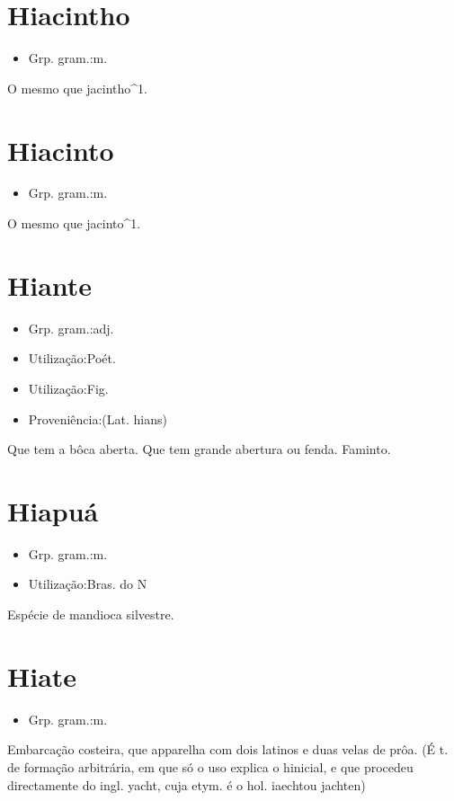 \documentclass{article}
\begin{document}
\section{Hiacintho}
\begin{itemize}
\item {Grp. gram.:m.}
\end{itemize}
O mesmo que \textunderscore jacintho\textunderscore ^1.
\section{Hiacinto}
\begin{itemize}
\item {Grp. gram.:m.}
\end{itemize}
O mesmo que \textunderscore jacinto\textunderscore ^1.
\section{Hiante}
\begin{itemize}
\item {Grp. gram.:adj.}
\end{itemize}
\begin{itemize}
\item {Utilização:Poét.}
\end{itemize}
\begin{itemize}
\item {Utilização:Fig.}
\end{itemize}
\begin{itemize}
\item {Proveniência:(Lat. \textunderscore hians\textunderscore )}
\end{itemize}
Que tem a bôca aberta.
Que tem grande abertura ou fenda.
Faminto.
\section{Hiapuá}
\begin{itemize}
\item {Grp. gram.:m.}
\end{itemize}
\begin{itemize}
\item {Utilização:Bras. do N}
\end{itemize}
Espécie de mandioca silvestre.
\section{Hiate}
\begin{itemize}
\item {Grp. gram.:m.}
\end{itemize}
Embarcação costeira, que apparelha com dois latinos e duas velas de prôa.
(É t. de formação arbitrária, em que só o uso explica o \textunderscore h\textunderscore  inicial, e que procedeu directamente do ingl. \textunderscore yacht\textunderscore , cuja etym. é o hol. \textunderscore iaecht\textunderscore  ou \textunderscore jachten\textunderscore )
\end{document}
